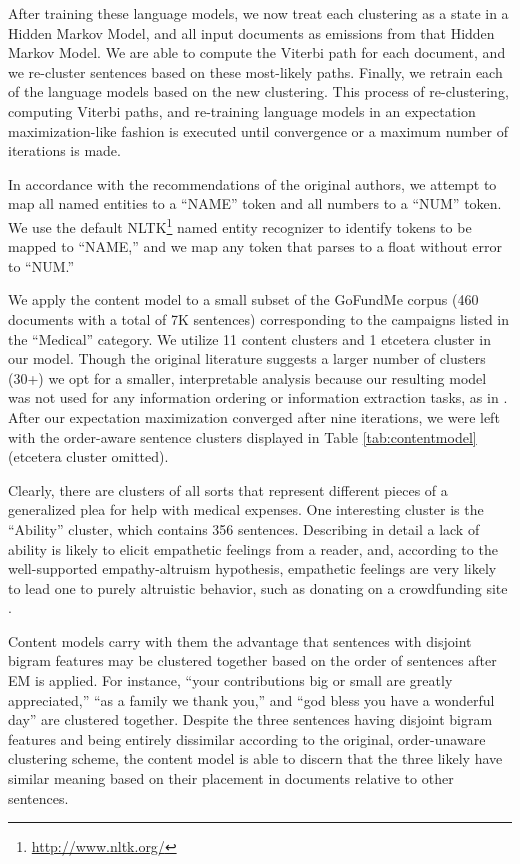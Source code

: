\documentclass[letterpaper]{article}
\begin{document}
After training these language models, we now treat each clustering as a state in a Hidden Markov Model, and all input documents as emissions from that Hidden Markov Model. We are able to compute the Viterbi path for each document, and we re-cluster sentences based on these most-likely paths. Finally, we retrain each of the language models based on the new clustering. This process of re-clustering, computing Viterbi paths, and re-training language models in an expectation 
maximization-like fashion is executed until convergence or a maximum number of iterations is made. 

In accordance with the recommendations of the original authors, we attempt to map all named entities to a ``NAME'' token and all numbers to a ``NUM'' token. We use the default NLTK\footnote{\url{http://www.nltk.org/}} named entity recognizer to identify tokens to be mapped to ``NAME,'' and we map any token that parses to a float without error to ``NUM.''

We apply the content model to a small subset of the GoFundMe corpus (460 documents with a total of 7K sentences) corresponding to the campaigns listed in the ``Medical'' category. We utilize 11 content clusters and 1 etcetera cluster in our model. Though the original literature suggests a larger number of clusters (30+) we opt for a smaller, interpretable analysis because our resulting model was not used for any information ordering or information extraction tasks, as in \cite{barzilay2004catching}. After our expectation maximization converged after nine iterations, we were left with the order-aware sentence clusters displayed in Table \ref{tab:contentmodel} (etcetera cluster omitted).

Clearly, there are clusters of all sorts that represent different pieces of a generalized plea for help with medical expenses. One interesting cluster is the ``Ability'' cluster, which contains 356 sentences. Describing in detail a lack of ability is likely to elicit empathetic feelings from a reader, and, according to the well-supported empathy-altruism hypothesis, empathetic feelings are very likely to lead one to purely altruistic behavior, such as donating on a crowdfunding site \cite{batson1988five}.

Content models carry with them the advantage that sentences with disjoint bigram features may be clustered together based on the order of sentences after EM is applied. For instance, ``your contributions big or small are greatly appreciated,'' ``as a family we thank you,'' and ``god bless you have a wonderful day'' are clustered together. Despite the three sentences having disjoint bigram features and being entirely dissimilar according to the original, order-unaware clustering scheme, the content model is able to discern that the three likely have similar meaning based on their placement in documents relative to other sentences.
\end{document}
